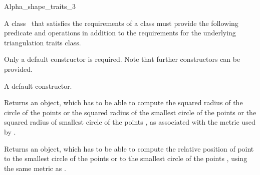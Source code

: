 \begin{ccRefClass} {Alpha_shape_traits_3}


\ccDefinition
A class \ccClassName\ that satisfies the requirements of a
 class must provide the following predicate and
operations in addition to the requirements for the underlying triangulation
traits class.

\ccTypes


\ccCreation

Only a default constructor is required. Note that further constructors
can be provided. 

{A default constructor.}


{Returns an object, which has to be able to compute the squared radius of the
circle of the points  or the squared radius of the
smallest circle of the points  or the squared radius of smallest circle
of the points , as  associated with the metric used
by .} 


{Returns an object, which has to be able to compute the relative position of
point  to the smallest circle of the points  or 
to the smallest circle of the points , using the
same metric as .}

\end{ccRefClass}

